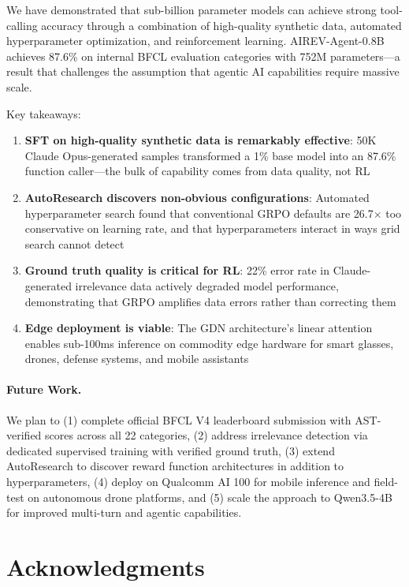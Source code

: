 \documentclass[10pt,twocolumn]{article}
\begin{document}
We have demonstrated that sub-billion parameter models can achieve strong tool-calling accuracy through a combination of high-quality synthetic data, automated hyperparameter optimization, and reinforcement learning. AIREV-Agent-0.8B achieves 87.6\% on internal BFCL evaluation categories with 752M parameters---a result that challenges the assumption that agentic AI capabilities require massive scale.

Key takeaways:

\begin{enumerate}[itemsep=1pt]
    \item \textbf{SFT on high-quality synthetic data is remarkably effective}: 50K Claude Opus-generated samples transformed a 1\% base model into an 87.6\% function caller---the bulk of capability comes from data quality, not RL
    \item \textbf{AutoResearch discovers non-obvious configurations}: Automated hyperparameter search found that conventional GRPO defaults are 26.7$\times$ too conservative on learning rate, and that hyperparameters interact in ways grid search cannot detect
    \item \textbf{Ground truth quality is critical for RL}: 22\% error rate in Claude-generated irrelevance data actively degraded model performance, demonstrating that GRPO amplifies data errors rather than correcting them
    \item \textbf{Edge deployment is viable}: The GDN architecture's linear attention enables sub-100ms inference on commodity edge hardware for smart glasses, drones, defense systems, and mobile assistants
\end{enumerate}

\paragraph{Future Work.} We plan to (1) complete official BFCL V4 leaderboard submission with AST-verified scores across all 22 categories, (2) address irrelevance detection via dedicated supervised training with verified ground truth, (3) extend AutoResearch to discover reward function architectures in addition to hyperparameters, (4) deploy on Qualcomm AI 100 for mobile inference and field-test on autonomous drone platforms, and (5) scale the approach to Qwen3.5-4B for improved multi-turn and agentic capabilities.

\section*{Acknowledgments}
\end{document}
